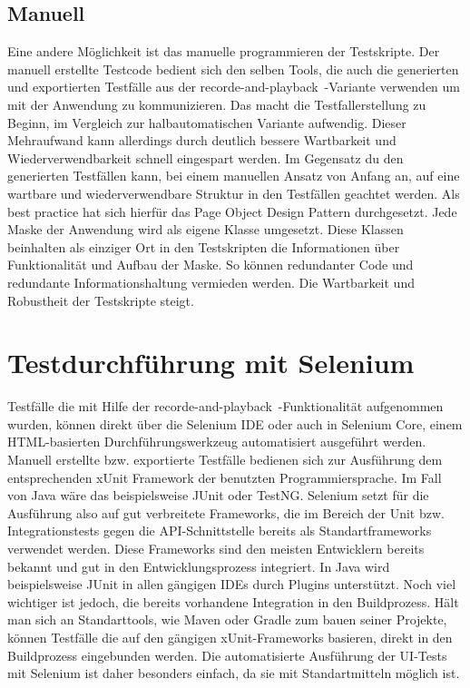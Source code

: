 \subsection{Manuell}
\label{sec:manuell}
Eine andere Möglichkeit ist das manuelle programmieren der Testskripte. Der manuell erstellte Testcode bedient sich den selben Tools, die auch die generierten und exportierten Testfälle aus der \glqq recorde-and-playback\glqq\ -Variante verwenden um mit der Anwendung zu kommunizieren. Das macht die Testfallerstellung zu Beginn, im Vergleich zur halbautomatischen Variante aufwendig. Dieser Mehraufwand kann allerdings durch deutlich bessere Wartbarkeit und Wiederverwendbarkeit schnell eingespart werden. Im Gegensatz du den generierten Testfällen kann, bei einem manuellen Ansatz von Anfang an, auf eine wartbare und wiederverwendbare Struktur in den Testfällen geachtet werden. Als best practice hat sich hierfür das Page Object Design Pattern \cite{selenium_test_????} durchgesetzt. Jede Maske der Anwendung wird als eigene Klasse umgesetzt. Diese Klassen beinhalten als einziger Ort in den Testskripten die Informationen über Funktionalität und Aufbau der Maske. So können redundanter Code und redundante Informationshaltung vermieden werden. Die Wartbarkeit und Robustheit der Testskripte steigt.


\section{Testdurchführung mit Selenium}
\label{sec:testdurchführung_mit_selenium}

Testfälle die mit Hilfe der \glqq recorde-and-playback\glqq\ -Funktionalität aufgenommen wurden, können direkt über die Selenium IDE oder auch in Selenium Core, einem HTML-basierten Durchführungswerkzeug automatisiert ausgeführt werden. 
Manuell erstellte bzw. exportierte Testfälle bedienen sich zur Ausführung dem entsprechenden xUnit Framework der benutzten Programmiersprache. Im Fall von Java wäre das beispielsweise JUnit oder TestNG. Selenium setzt für die Ausführung also auf gut verbreitete Frameworks, die im Bereich der Unit bzw. Integrationstests gegen die API-Schnittstelle bereits als Standartframeworks verwendet werden. Diese Frameworks sind den meisten Entwicklern bereits bekannt und gut in den Entwicklungsprozess integriert. In Java wird beispielsweise JUnit in allen gängigen IDEs durch Plugins unterstützt. Noch viel wichtiger ist jedoch, die bereits vorhandene Integration in den Buildprozess.
Hält man sich an Standarttools, wie Maven oder Gradle zum bauen seiner Projekte, können Testfälle die auf den gängigen xUnit-Frameworks basieren, direkt in den Buildprozess eingebunden werden.
Die automatisierte Ausführung der UI-Tests mit Selenium ist daher besonders einfach, da sie mit Standartmitteln möglich ist.

